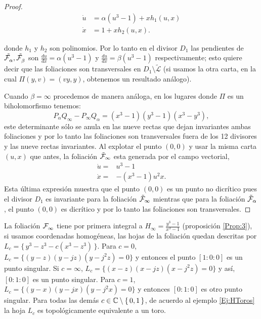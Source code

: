 \begin{proof}
\begin{align*}
\dot{u}&= \alpha(u^{3}-1) + xh_{1}(u,x)\\
\dot{x}&= 1 + xh_{2}(u,x).
\end{align*}  

\noindent donde $h_{1}$ y $h_{2}$ son polinomios. Por lo tanto en el divisor $D_{1}$ las pendientes de $\tilde{\mathcal{F}^{\ }_{\alpha}},\tilde{\mathcal{F}^{\ }_{\beta}}$ son $\tfrac{du}{dx}=\alpha(u^{3}-1)$ y $\tfrac{du}{dx}=\beta(u^{3}-1)$ respectivamente; esto quiere decir que las foliaciones son transversales en $D_{1}\setminus\tilde{\mathcal{L}}$ (si usamos la otra carta, en la cual $\Pi(y,v)=(vy,y)$, obtenemos un resultado análogo).

\noindent Cuando $\beta=\infty$ procedemos de manera análoga, en los lugares donde $\Pi$ es un biholomorfismo tenemos:
\begin{equation*}
P_{\alpha}Q_{\infty}-P_{\infty}Q_{\alpha}=(x^{3}-1)(y^{3}-1)(x^{3}-y^{3}),
\end{equation*}
\noindent este determinante sólo se anula en las nueve rectas que dejan invariantes ambas foliaciones y por lo tanto las foliaciones son transversales fuera de los 12 divisores y las nueve rectas invariantes. Al explotar el punto $(0,0)$ y usar la misma carta $(u,x)$ que antes, la foliación $\tilde{\mathcal{F}}_{\infty}$ esta generada por el campo vectorial,
\begin{align*}
\dot{u}=&u^{3}-1\\
\dot{x}=&-(x^{3}-1)u^{2}x.
\end{align*}
\noindent Esta última expresión muestra que el punto $(0,0)$ es un punto no dicrítico pues el divisor $D_{1}$ es invariante para la foliación $\tilde{\mathcal{F}}_{\infty}$ mientras que para la foliación $\tilde{\mathcal{F}}_{\alpha}$, el punto $(0,0)$ es dicrítico y por lo tanto las foliaciones son transversales. 
\end{proof}


La foliación $\mathcal{F}^{\ }_{\infty}$ tiene por primera integral a $H_{\infty}=\tfrac{y^{3}-1}{x^{3}-1}$ (proposición \ref{Prop:3}), si usamos coordenadas homogéneas, las hojas de la foliación quedan descritas por $L_{c}=\{\, y^{3}-z^{3}-c(x^{3}-z^{3}) \, \}$. Para $c=0$, $L_{c}=\{(y-z)(y-jz)(y-j^{2}z)=0\}$ y entonces el punto $[1:0:0]$ es un punto singular. Si $c=\infty$, $L_{c}=\{(x-z)(x-jz)(x-j^{2}z)=0\}$ y así, $[0:1:0]$ es un punto singular. Para $c=1$, $L_{c}=\{(y-x)(y-jx)(y-j^{2}x)=0\}$ y entonces $[0:1:0]$ es otro punto singular. Para todas las demás $c\in\mathbb{C}\setminus\{\, 0,1\, \}$, de acuerdo al ejemplo \ref{Ej:HToros} la hoja $L_{c}$ es topológicamente equivalente a un toro.\\

